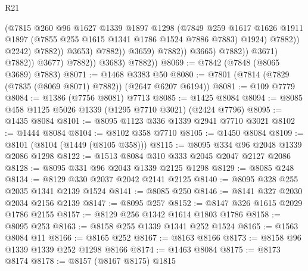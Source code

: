 \begin{lexlean}{R21}
\begin{coremodule}
                                                (@7815
                                                  @260
                                                  @96
                                                  @1627
                                                  @1339
                                                  @1897
                                                  @1298
                                                  (@7849
                                                    @259
                                                    @1617
                                                    @1626
                                                    @1911
                                                    @1897
                                                    (@7855 @255 @1615 @1341 @1786 @1524 @7886 @7883)
                                                    @1924)
                                                  @7882))
                                              @2242)
                                            @7882))
                                        @3653)
                                      @7882))
                                  @3659)
                                @7882))
                            @3665)
                          @7882))
                      @3671)
                    @7882))
                @3677)
              @7882))
          @3683)
        @7882))
@8069 := @7842 (@7848 (@8065 @3689) @7883)
@8071 := @1468 @3383 @50
@8080 := @7801 (@7814 (@7829 (@7835 (@8069 @8071) @7882)) (@2647 @6207 @6194))
@8081 := @109 @7779
@8084 := @1386 (@7756 @8081) @7713
@8085 := @1425 @8084
@8094 := @8085 @458 @1125 @5026 @1339 (@1295 @7710 @3021) (@2424 @7796)
@8095 := @1435 @8084
@8101 := @8095 @1123 @336 @1339 @2941 @7710 @3021
@8102 := @1444 @8084
@8104 := @8102 @358 @7710
@8105 := @1450 @8084
@8109 := @8101 (@8104 (@1449 (@8105 @358)))
@8115 := @8095 @334 @96 @2048 @1339 @2086 @1298
@8122 := @1513 @8084 @310 @333 @2045 @2047 @2127 @2086
@8128 := @8095 @331 @96 @2043 @1339 @2125 @1298
@8129 := @8085 @248
@8134 := @8129 @330 @2037 @2042 @2141 @2125
@8140 := @8095 @328 @255 @2035 @1341 @2139 @1524
@8141 := @8085 @250
@8146 := @8141 @327 @2030 @2034 @2156 @2139
@8147 := @8095 @257
@8152 := @8147 @326 @1615 @2029 @1786 @2155
@8157 := @8129 @256 @1342 @1614 @1803 @1786
@8158 := @8095 @253
@8163 := @8158 @255 @1339 @1341 @252 @1524
@8165 := @1563 @8084 @11
@8166 := @8165 @252
@8167 := @8163 @8166
@8173 := @8158 @96 @1339 @1339 @252 @1298 @8166
@8174 := @1463 @8084
@8175 := @8173 @8174
@8178 := @8157 (@8167 @8175) @1815

\end{coremodule}
\end{lexlean}
